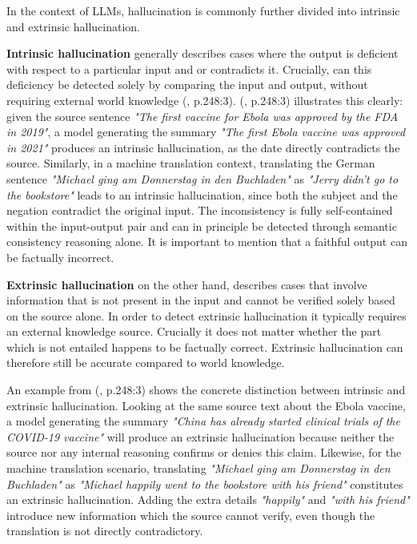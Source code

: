 \documentclass[
  seminar,   	 
  english,   	 
  titlepage=on,
  captions=tableheadings
]{ttlab-qualify}
\begin{document}
In the context of LLMs, hallucination is commonly further divided into intrinsic and extrinsic hallucination.

\textbf{Intrinsic hallucination} generally describes cases where the output is deficient with respect to a particular input and or contradicts it. Crucially, can this deficiency be detected solely by comparing the input and output, without requiring external world knowledge (\cite{Ji2023HallucinationSurvey}, p.248:3). (\cite{Ji2023HallucinationSurvey}, p.248:3) illustrates this clearly: given the source sentence \textit{"The first vaccine for Ebola was approved by the FDA in 2019"}, a model generating the summary \textit{"The first Ebola vaccine was approved in 2021"} produces an intrinsic hallucination, as the date directly contradicts the source. Similarly, in a machine
translation context, translating the German sentence \textit{"Michael ging am Donnerstag in den Buchladen"} as \textit{"Jerry didn't go to the bookstore"} leads to an intrinsic hallucination, since both the subject and the negation contradict the original input. The inconsistency is fully self-contained within the input-output pair and can in principle be detected through semantic consistency reasoning alone. It is important to mention that a faithful output can be factually incorrect.

\textbf{Extrinsic hallucination} on the other hand, describes cases that involve information that is not present in the input and cannot be verified solely based on the source alone. In order to detect extrinsic hallucination it typically requires an external knowledge source. Crucially it does not matter whether the part which is not entailed happens to be factually correct. Extrinsic hallucination can therefore still be accurate compared to world knowledge.

An example from (\cite{Ji2023HallucinationSurvey}, p.248:3) shows the concrete distinction between intrinsic and extrinsic hallucination. Looking at the same source text about the Ebola vaccine, a model generating the summary \textit{"China has already started clinical trials of the COVID-19 vaccine"} will produce an extrinsic hallucination because neither the source nor any internal reasoning confirms or denies this claim. Likewise, for the machine translation scenario, translating \textit{"Michael ging am Donnerstag in den Buchladen"} as
\textit{"Michael happily went to the bookstore with his friend"} constitutes an extrinsic hallucination. Adding the extra details \textit{"happily"} and \textit{"with his friend"} introduce new information which the source cannot verify, even though the translation is not directly contradictory.
\newline
\end{document}
